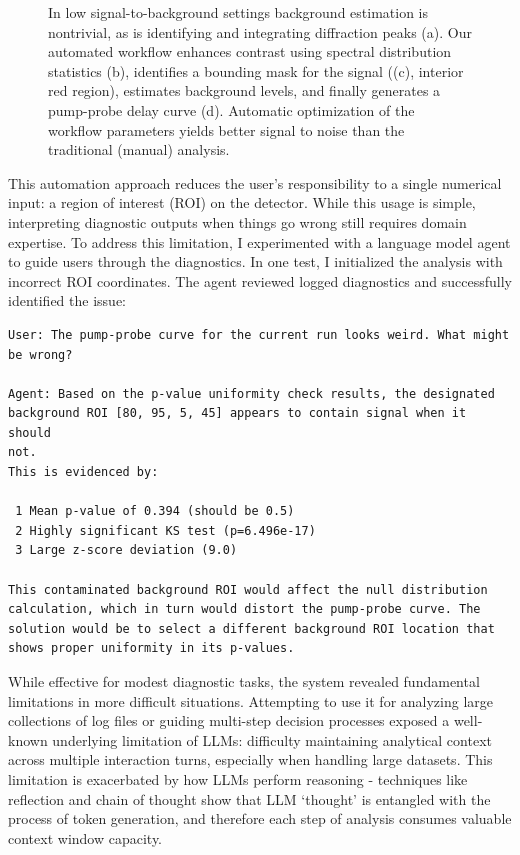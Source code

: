 \documentclass{article}
\begin{document}
\begin{figure}[htbp]
    \caption{In low signal-to-background settings background estimation is nontrivial, as is identifying and integrating diffraction peaks (a). Our automated workflow enhances contrast using spectral distribution statistics (b), identifies a bounding mask for the signal ((c), interior red region), estimates background levels, and finally generates a pump-probe delay curve (d). Automatic optimization of the workflow parameters yields better signal to noise than the traditional (manual) analysis.}\label{pipeline}
    \label{fig:analysis}
\end{figure}
This automation approach reduces the user's responsibility to a single numerical input: a region of interest (ROI) on the detector. While this usage is simple, interpreting diagnostic outputs when things go wrong still requires domain expertise. To address this limitation, I experimented with a language model agent to guide users through the diagnostics. In one test, I initialized the analysis with incorrect ROI coordinates. The agent reviewed logged diagnostics and successfully identified the issue:

    \vspace{0.3cm}
    \begin{Verbatim}[fontsize=\small,frame=single]
User: The pump-probe curve for the current run looks weird. What might
be wrong?

Agent: Based on the p-value uniformity check results, the designated 
background ROI [80, 95, 5, 45] appears to contain signal when it should 
not.                                                                    
This is evidenced by:

 1 Mean p-value of 0.394 (should be 0.5)
 2 Highly significant KS test (p=6.496e-17)
 3 Large z-score deviation (9.0)

This contaminated background ROI would affect the null distribution     
calculation, which in turn would distort the pump-probe curve. The      
solution would be to select a different background ROI location that    
shows proper uniformity in its p-values.
    \end{Verbatim}


While effective for modest diagnostic tasks, the system revealed fundamental limitations in more difficult situations. Attempting to use it for analyzing large collections of log files or guiding multi-step decision processes exposed a well-known underlying limitation of LLMs: difficulty maintaining analytical context across multiple interaction turns, especially when handling large datasets. This limitation is exacerbated by how LLMs perform reasoning -  techniques like reflection and chain of thought show that LLM `thought' is entangled with the process of token generation, and therefore each step of analysis consumes valuable context window capacity.
\end{document}
